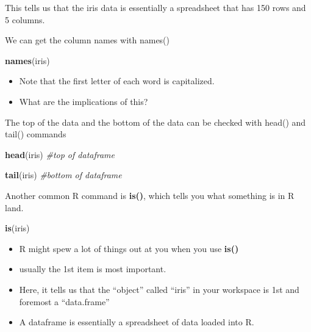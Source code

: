\documentclass[]{book}
\newenvironment{Shaded}{\begin{snugshade}}{\end{snugshade}}
\newcommand{\KeywordTok}[1]{\textcolor[rgb]{0.13,0.29,0.53}{\textbf{#1}}}
\newcommand{\CommentTok}[1]{\textcolor[rgb]{0.56,0.35,0.01}{\textit{#1}}}
\newcommand{\NormalTok}[1]{#1}
\providecommand{\tightlist}{%
  \setlength{\itemsep}{0pt}\setlength{\parskip}{0pt}}
\theoremstyle{definition}
\theoremstyle{definition}
\theoremstyle{definition}
\theoremstyle{remark}
\begin{document}
This tells us that the iris data is essentially a spreadsheet that has
150 rows and 5 columns.

We can get the column names with names()

\begin{Shaded}
\begin{Highlighting}[]
\KeywordTok{names}\NormalTok{(iris)}
\end{Highlighting}
\end{Shaded}

\begin{itemize}
\tightlist
\item
  Note that the first letter of each word is capitalized.\\
\item
  What are the implications of this?
\end{itemize}

The top of the data and the bottom of the data can be checked with
head() and tail() commands

\begin{Shaded}
\begin{Highlighting}[]
\KeywordTok{head}\NormalTok{(iris) }\CommentTok{#top of dataframe}

\KeywordTok{tail}\NormalTok{(iris) }\CommentTok{#bottom of dataframe}
\end{Highlighting}
\end{Shaded}

Another common R command is \textbf{is()}, which tells you what
something is in R land.

\begin{Shaded}
\begin{Highlighting}[]
\KeywordTok{is}\NormalTok{(iris)}
\end{Highlighting}
\end{Shaded}

\begin{itemize}
\tightlist
\item
  R might spew a lot of things out at you when you use \textbf{is()}
\item
  usually the 1st item is most important.\\
\item
  Here, it tells us that the ``object'' called ``iris'' in your
  workspace is 1st and foremost a ``data.frame''
\item
  A dataframe is essentially a spreadsheet of data loaded into R.
\end{itemize}
\end{document}
